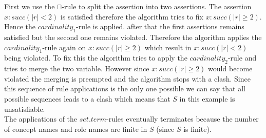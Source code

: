 \documentclass[a4paper,11pt]{scrartcl}
\theoremstyle{break}
\theoremstyle{definition}
\begin{document}
First we use the $\sqcap$-rule to split the assertion into two assertions. The assertion $x:succ(|r|<2)$ is satisfied therefore the algorithm tries to fix $x:succ(|r|\geq 2)$. Hence the $cardinality_1$-rule is applied. after that the first assertions remains satisfied but the second one remains violated. Therefore the algorithm applies the $cardinality_1$-rule again on $x:succ(|r|\geq 2)$ which result in $x:succ(|r|<2)$ being violated. To fix this the algorithm tries to apply the $cardinality_2$-rule and tries to merge the two variable. However since $x:succ(|r|\geq 2)$ would become violated the merging is preempted and the algorithm stops with a clash. Since this sequence of rule applications is the only one possible we can say that all possible sequences leads to a clash which means that $S$ in this example is unsatisfiable.\\
The applications of the $set.term$-rules eventually terminates because the number of concept names and role names are finite in $S$ (since $S$ is finite).
\end{document}
